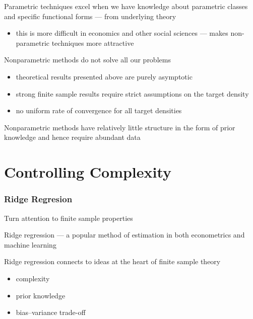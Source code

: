 \begin{frame}

    \vspace{2em}
    Parametric techniques excel when we have knowledge about parametric
    classes and specific functional forms --- from underlying theory 
    \begin{itemize}
        \item this is more difficult in economics and other social sciences 
        --- makes non-parametric techniques more attractive 
    \end{itemize}

    \vspace{.7em}
    Nonparametric methods do not solve all our problems
    \begin{itemize}
        \item theoretical results presented above are purely asymptotic
        \item strong finite sample
        results require strict assumptions on the target density
        \item no uniform rate of convergence for all target densities
    \end{itemize}
    
\end{frame}

\begin{frame}

    \vspace{2em}
    Nonparametric
    methods have relatively little structure in the form of prior knowledge and hence
    require abundant data

\end{frame}

\section{Controlling Complexity}

\begin{frame}\frametitle{Ridge Regresion}
    
    \vspace{2em}
    Turn attention to finite sample
    properties
    
    Ridge regression --- a popular
    method of estimation in both econometrics and machine learning 
    
    \vspace{.7em}
    Ridge regression connects to ideas at
    the heart of finite sample theory
    \begin{itemize}
        \item complexity
        \item prior knowledge
        \item  bias--variance trade-off
    \end{itemize}
    
\end{frame}

